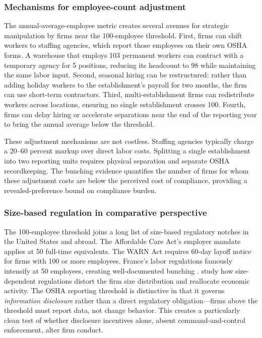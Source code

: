 \documentclass[12pt]{article}
\begin{document}
\subsubsection*{Mechanisms for employee-count adjustment} The annual-average-employee metric creates several avenues for strategic manipulation by firms near the 100-employee threshold. First, firms can shift workers to staffing agencies, which report those employees on their own OSHA forms. A warehouse that employs 103 permanent workers can contract with a temporary agency for 5 positions, reducing its headcount to 98 while maintaining the same labor input. Second, seasonal hiring can be restructured: rather than adding holiday workers to the establishment's payroll for two months, the firm can use short-term contractors. Third, multi-establishment firms can redistribute workers across locations, ensuring no single establishment crosses 100. Fourth, firms can delay hiring or accelerate separations near the end of the reporting year to bring the annual average below the threshold.

These adjustment mechanisms are not costless. Staffing agencies typically charge a 20--60 percent markup over direct labor costs. Splitting a single establishment into two reporting units requires physical separation and separate OSHA recordkeeping. The bunching evidence quantifies the number of firms for whom these adjustment costs are below the perceived cost of compliance, providing a revealed-preference bound on compliance burden.

\subsubsection*{Size-based regulation in comparative perspective} The 100-employee threshold joins a long list of size-based regulatory notches in the United States and abroad. The Affordable Care Act's employer mandate applies at 50 full-time equivalents. The WARN Act requires 60-day layoff notice for firms with 100 or more employees. France's labor regulations famously intensify at 50 employees, creating well-documented bunching \citep{garicano2016}. \citet{gourio2014} study how size-dependent regulations distort the firm size distribution and reallocate economic activity. The OSHA reporting threshold is distinctive in that it governs \textit{information disclosure} rather than a direct regulatory obligation---firms above the threshold must report data, not change behavior. This creates a particularly clean test of whether disclosure incentives alone, absent command-and-control enforcement, alter firm conduct.
\end{document}
